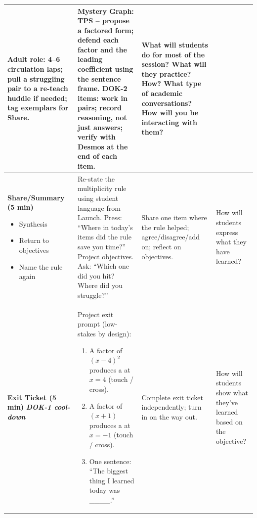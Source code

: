 \documentclass[11pt]{article}
\begin{document}
\begin{xltabular}{\textwidth}{|p{1.15in}|p{2.1in}|p{1.6in}|p{0.95in}|}
\textbf{Adult role:} 4--6 circulation laps; pull a struggling pair to a re-teach huddle if needed; tag exemplars for Share. &
\textbf{Mystery Graph:} TPS -- propose a factored form; defend each factor and the leading coefficient using the sentence frame. \newline\newline
\textbf{DOK-2 items:} work in pairs; record reasoning, not just answers; verify with Desmos at the end of each item. &
What will students do for most of the session? What will they practice? How? \newline\newline
What type of academic conversations? \newline\newline
How will you be interacting with them? \\
\hline

\textbf{Share/\allowbreak Summary (5 min)}
\begin{itemize}[label=$\bullet$, leftmargin=*, nosep]
    \item Synthesis
    \item Return to objectives
    \item Name the rule again
\end{itemize} &
Re-state the multiplicity rule using student language from Launch. Press: ``Where in today's items did the rule save you time?'' \newline\newline
Project objectives. Ask: ``Which one did you hit? Where did you struggle?'' &
Share one item where the rule helped; agree/disagree/add on; reflect on objectives. &
How will students express what they have learned? \\
\hline

\textbf{Exit Ticket (5 min)} \newline \textbf{\textit{DOK-1 cool-down}} &
Project exit prompt (low-stakes by design):
\begin{enumerate}[label=\arabic*., leftmargin=*, nosep]
    \item A factor of $(x-4)^2$ produces a \underline{\hspace{2em}} at $x=4$ (touch / cross).
    \item A factor of $(x+1)$ produces a \underline{\hspace{2em}} at $x=-1$ (touch / cross).
    \item One sentence: ``The biggest thing I learned today was \_\_\_\_.''
\end{enumerate} &
Complete exit ticket independently; turn in on the way out. &
How will students show what they've learned based on the objective? \\
\hline

\end{xltabular}
\end{document}
